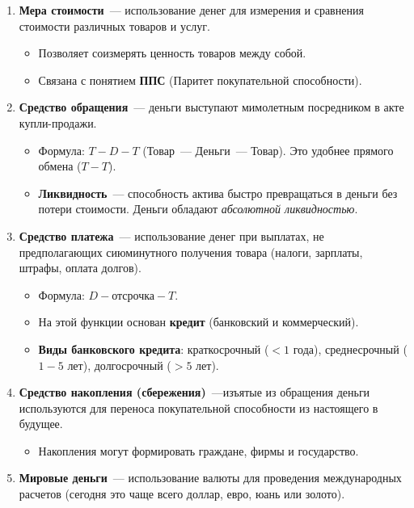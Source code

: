 \documentclass[12pt]{article}
\begin{document}
	\begin{enumerate}
		\item \textbf{Мера стоимости}~--- использование денег для измерения и сравнения стоимости различных товаров и услуг. 
		
		\begin{itemize}
			\item Позволяет соизмерять ценность товаров между собой.
			\item Связана с понятием \textbf{ППС} (Паритет покупательной способности).
		\end{itemize}
		
		\item \textbf{Средство обращения}~--- деньги выступают мимолетным посредником в акте купли-продажи.
		
		\begin{itemize}
			\item Формула: $T - D - T$ (Товар~--- Деньги~--- Товар). Это удобнее прямого обмена ($T - T$).
			\item \textbf{Ликвидность}~--- способность актива быстро превращаться в деньги без потери стоимости. Деньги обладают \textit{абсолютной ликвидностью}.
		\end{itemize}
		
		\item \textbf{Средство платежа}~--- использование денег при выплатах, не предполагающих сиюминутного получения товара (налоги, зарплаты, штрафы, оплата долгов).
		
		\begin{itemize}
			\item Формула: $D - \text{отсрочка} - T$.
			\item На этой функции основан \textbf{кредит} (банковский и коммерческий).
			\item \textbf{Виды банковского кредита}: краткосрочный ($< 1$ года), среднесрочный ($1-5$ лет), долгосрочный ($> 5$ лет).
		\end{itemize}
		
		\item \textbf{Средство накопления (сбережения)}~---изъятые из обращения деньги используются для переноса покупательной способности из настоящего в будущее.
		
		\begin{itemize}
			\item Накопления могут формировать граждане, фирмы и государство.
		\end{itemize}
		
		\item \textbf{Мировые деньги}~--- использование валюты для проведения международных расчетов (сегодня это чаще всего доллар, евро, юань или золото).
	\end{enumerate}
	
\end{document}

